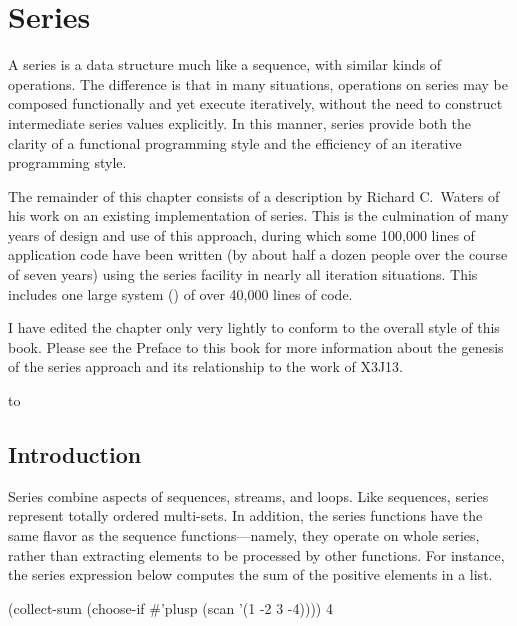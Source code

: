 

\clearpage\def\pagestatus{FINAL PROOF}

\chapter{Series}
\label{SERIES}

\def\SU#1{${}_{#1}$}

\def\fooprime#1{#1'}

\begin{new}
\prefaceword A series is a data structure much like a sequence, with similar
kinds of operations.  The difference is that in many situations, operations
on series may be composed functionally and yet execute iteratively, without
the need to construct intermediate series values explicitly.  In this
manner, series provide both the clarity of a functional programming style
and the efficiency of an iterative programming style.

The remainder of this chapter consists of a description by Richard
C.~Waters of his work on an existing implementation of series.
This is the culmination of many years of design and use of this approach,
during which some 100,000 lines of application code have been written (by
about half a dozen people over the course of seven years) using the series
facility in nearly all iteration situations.  This includes one large
system () of over 40,000 lines of code.

I have edited the chapter only very lightly to conform to the overall style
of this book.  Please see the Preface to this book for more information
about the genesis of the series approach and its relationship to the work
of X3J13.
\end{new}


\noindent\hbox to \textwidth{\hss---Guy L. Steele Jr.}

\section{Introduction}

Series combine aspects of sequences, streams, and loops.  Like sequences,
series represent totally ordered multi-sets.  In addition, the series
functions have the same flavor as the sequence functions---namely, they
operate on whole series, rather than extracting elements to be
processed by other functions.  For instance, the series expression below
computes the sum of the positive elements in a list.
\begin{lisp}
(collect-sum (choose-if \#'plusp (scan '(1 -2 3 -4)))) {\EV} 4
\end{lisp}

